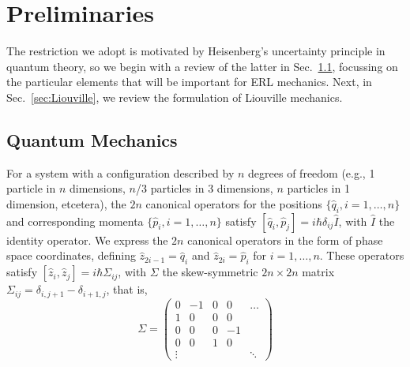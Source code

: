 \documentclass[pra,superscriptaddress,nofootinbib,12pt]{revtex4-2}
\begin{document}
\section{Preliminaries}

\label{sec:Prelim}

The restriction we adopt is motivated by Heisenberg's uncertainty principle in quantum theory, so we begin with a review of the latter in Sec.~\ref{sec:QuantumIntro}, focussing on the particular elements that will be important for ERL mechanics.  Next, in Sec.~\ref{sec:Liouville}, we review the formulation of Liouville mechanics.

\subsection{Quantum Mechanics}
\label{sec:QuantumIntro}

For a system with a configuration described by $n$ degrees of freedom (e.g., 1 particle in $n$ dimensions, $n$/3 particles in 3 dimensions, $n$ particles in 1 dimension, etcetera), the $2n$ canonical operators for the positions $\{\hat{q}_{i},i=1,\ldots ,n\}$ and corresponding momenta $\{\hat{p}_{i},i=1,\ldots ,n\}$ satisfy $[\hat{q}_{i},\hat{p}_{j}]=i\hbar \delta _{ij}\hat{I}$, with $\hat{I}$ the identity operator. We express the $2n$ canonical operators in the form of phase space coordinates, defining $\hat{z}_{2i-1}=\hat{q}_{i}$ and $\hat{z}_{2i}=\hat{p}_{i}$ for $i=1,\ldots ,n$.  These operators satisfy $[\hat{z}_{i},\hat{z}_{j}]=i\hbar \Sigma _{ij}$, with $\Sigma$ the skew-symmetric $2n\times 2n$ matrix $\Sigma_{ij}=\delta _{i,j+1}-\delta _{i+1,j}$, that is,
\begin{equation}
\label{eq:SymplecticForm}
\Sigma =
\begin{pmatrix}
0 & -1 &  0 & 0 & \dots \\
1 & 0 &  0 & 0 & \\
0 & 0 & 0  & -1 & \\
0 & 0 & 1 & 0 &  \\
 \vdots & &  & & \ddots
\end{pmatrix}
\end{equation}

\end{document}
